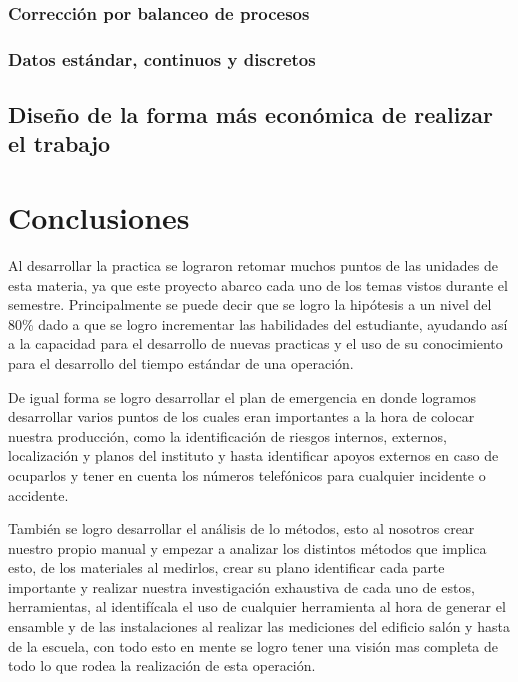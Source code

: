     
    \subsubsection{Corrección por balanceo de procesos}
    
    
    
    \subsubsection{Datos estándar, continuos y discretos}
    \subsection{Diseño de la forma más económica de realizar el trabajo}
    
    
    
    
    
    
    \section{Conclusiones}
    
    Al desarrollar la practica se lograron retomar muchos puntos de las unidades de esta materia, ya que este proyecto abarco cada uno de los temas vistos durante el semestre. Principalmente se puede decir que se logro la hipótesis a un nivel del 80\% dado a que se logro incrementar las habilidades del estudiante, ayudando así a la capacidad para el desarrollo de nuevas practicas y el uso de su conocimiento para el desarrollo del tiempo estándar de una operación.
    
    
    De igual forma se logro desarrollar el plan de emergencia en donde logramos desarrollar varios puntos de los cuales eran importantes a la hora de colocar nuestra producción, como la identificación de riesgos internos, externos, localización y planos del instituto y hasta identificar apoyos externos en caso de ocuparlos y tener en cuenta los números telefónicos para cualquier incidente o accidente.
    
    
    También se logro desarrollar el análisis de lo métodos, esto al nosotros crear nuestro propio manual y empezar a analizar los distintos métodos que implica esto, de los materiales al medirlos, crear su plano identificar cada parte importante y realizar nuestra investigación exhaustiva de cada uno de estos, herramientas, al identifícala el uso de cualquier herramienta al hora de generar el ensamble y de las instalaciones al realizar las mediciones del edificio salón y hasta de la escuela, con todo esto en mente se logro tener una visión mas completa de todo lo que rodea la realización de esta operación.
    
